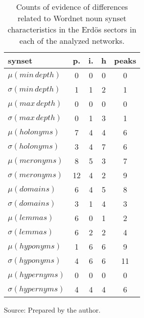 \begin{table}[h!]
\begin{center}
\caption{Counts of evidence of differences related to Wordnet noun synset characteristics in the Erd\"os sectors in each of the analyzed networks.}
\begin{tabular}{| l || c | c | c || c |}\hline
{\bf synset} & {\bf p.} & {\bf i.} & {\bf h} & {\bf peaks} \\\hline\hline
$\mu(min\,depth)$ & 0  & 0  & 0  & 0 \\
$\sigma(min\,depth)$ & 1  & 1  & 2  & 1 \\\hline
$\mu(max\,depth)$ & 0  & 0  & 0  & 0 \\
$\sigma(max\,depth)$ & 0  & 1  & 3  & 1 \\\hline
$\mu(holonyms)$ & 7  & 4  & 4  & 6 \\
$\sigma(holonyms)$ & 3  & 4  & 7  & 6 \\\hline
$\mu(meronyms)$ & 8  & 5  & 3  & 7 \\
$\sigma(meronyms)$ & 12  & 4  & 2  & 9 \\\hline
$\mu(domains)$ & 6  & 4  & 5  & 8 \\
$\sigma(domains)$ & 3  & 1  & 4  & 3 \\\hline
$\mu(lemmas)$ & 6  & 0  & 1  & 2 \\
$\sigma(lemmas)$ & 6  & 2  & 2  & 4 \\\hline
$\mu(hyponyms)$ & 1  & 6  & 6  & 9 \\
$\sigma(hyponyms)$ & 4  & 6  & 6  & 11 \\\hline
$\mu(hypernyms)$ & 0  & 0  & 0  & 0 \\
$\sigma(hypernyms)$ & 4  & 4  & 4  & 6 \\\hline
\end{tabular}
\begin{flushleft}
		Source: Prepared by the author.\
\end{flushleft}
\end{center}
\end{table}
